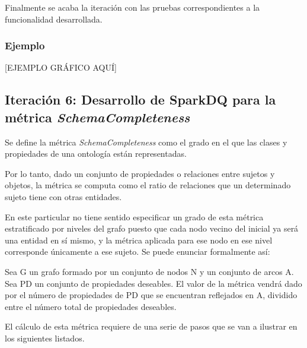 Finalmente se acaba la iteración con las pruebas correspondientes a la
funcionalidad desarrollada. 

\subsubsection{Ejemplo}

[EJEMPLO GRÁFICO AQUÍ]

\subsection{Iteración 6: Desarrollo de SparkDQ para la métrica
  \textit{SchemaCompleteness}}



Se define la métrica \textit{SchemaCompleteness} como el grado en el que las
clases y propiedades de una ontología están representadas. 

Por lo
tanto, dado un conjunto de propiedades o relaciones entre sujetos y objetos, la
métrica se computa como el ratio de relaciones que un determinado sujeto tiene
con otras entidades. 

En este particular no tiene sentido especificar un grado de esta métrica
estratificado por niveles del grafo puesto que cada nodo vecino del inicial ya
será una entidad en sí mismo, y la métrica aplicada para ese nodo en ese nivel
corresponde únicamente a ese sujeto. Se puede enunciar formalmente así: 

Sea G un grafo formado por un conjunto de nodos N y un conjunto de arcos A. Sea PD un conjunto de propiedades deseables. El valor de la
métrica vendrá dado por el número de propiedades de PD que se
encuentran reflejados en A, dividido entre el número total de propiedades
deseables. 

El cálculo de esta métrica requiere de una serie de pasos que se van a ilustrar
en los siguientes listados. 

